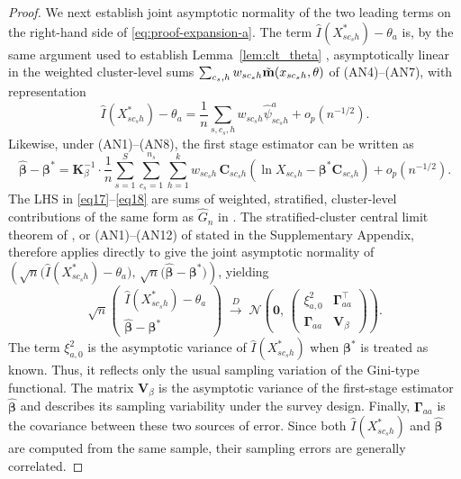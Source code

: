 \documentclass[12pt]{article}
\theoremstyle{plain}
\theoremstyle{definition}
\begin{document}
\begin{proof}
We next establish joint asymptotic normality of the two leading terms on the right-hand side of
\eqref{eq:proof-expansion-a}. The term $\hat I(X^*_{sc_sh})-\theta_a$ is, by the same argument
used to establish Lemma~\ref{lem:clt_theta} \citep{Bhattacharya2007}, asymptotically linear in the
weighted cluster-level sums $\sum_{c_s,h} w_{sc_sh}\Tilde{\mathbf m}(x_{sc_sh},\theta)$ of
(AN4)--(AN7), with representation
\begin{equation}
\hat I(X^*_{sc_sh})-\theta_a = \frac{1}{n}\sum_{s,c_s,h} w_{sc_sh}\hat\psi^a_{sc_sh} + o_p(n^{-1/2}).
\label{eq17}
\end{equation}
Likewise, under (AN1)--(AN8), the first stage estimator can be written as
\begin{equation}
\hat{\boldsymbol\beta}-\boldsymbol\beta^*
=
\mathbf K_\beta^{-1}\cdot\frac{1}{n}
\sum_{s=1}^S\sum_{c_s=1}^{n_s}\sum_{h=1}^k
w_{sc_sh}\,\mathbf C_{sc_sh}
\left(\ln X_{sc_sh}-\boldsymbol\beta^*\mathbf C_{sc_sh}\right)
+o_p(n^{-1/2}).
\label{eq18}
\end{equation}
The LHS in \eqref{eq17}--\eqref{eq18} are sums of weighted, stratified, cluster-level contributions of the same form as $\widehat G_n$ in \cite{Bhattacharya2007}. The stratified-cluster central limit theorem of \cite{Bhattacharya2007}, or (AN1)--(AN12) of \cite{shivam2026asymptotic} stated in the Supplementary Appendix, therefore applies directly to give the joint asymptotic normality of
$\left(
\sqrt n\big(\hat I(X^*_{sc_sh})-\theta_a\big),\,
\sqrt n\big(\hat{\boldsymbol\beta}-\boldsymbol\beta^*\big)
\right)$, yielding
\[
\sqrt n
\begin{pmatrix}
\hat I(X^*_{sc_sh})-\theta_a\\
\hat{\boldsymbol\beta}-\boldsymbol\beta^*
\end{pmatrix}
\;\xrightarrow{D}\;
\mathcal N\!\left(\mathbf 0,\,
\begin{pmatrix}
\xi_{a,0}^2 & \boldsymbol\Gamma_{aa}^\top\\
\boldsymbol\Gamma_{aa} & \mathbf V_\beta
\end{pmatrix}
\right).
\]
The term
$\xi_{a,0}^2$ is the asymptotic variance of $\hat I(X^*_{sc_sh})$ when
$\boldsymbol\beta^*$ is treated as known. Thus, it reflects only the usual sampling
variation of the Gini-type functional. The matrix $\mathbf V_\beta$ is the asymptotic
variance of the first-stage estimator $\hat{\boldsymbol\beta}$ and describes its sampling
variability under the survey design. Finally, $\boldsymbol\Gamma_{aa}$ is the covariance
between these two sources of error. Since both $\hat I(X^*_{sc_sh})$ and
$\hat{\boldsymbol\beta}$ are computed from the same sample, their sampling errors are
generally correlated.


\end{proof}
\end{document}
